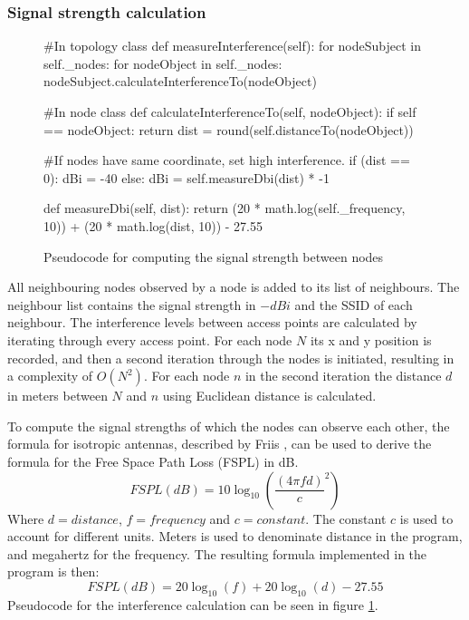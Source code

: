 	\subsubsection{Signal strength calculation}
	\begin{figure}
		\begin{python}
			#In topology class
			def measureInterference(self):
				for nodeSubject in self._nodes:  
					for nodeObject in self._nodes:
						nodeSubject.calculateInterferenceTo(nodeObject) 

			#In node class
			def calculateInterferenceTo(self, nodeObject):
				if self == nodeObject:
					return
				dist = round(self.distanceTo(nodeObject))

			#If  nodes have same coordinate, set high interference. 
				if (dist == 0):
					dBi = -40
				else:
					dBi  = self.measureDbi(dist) * -1

			def measureDbi(self, dist):
				return (20 * math.log(self._frequency, 10)) + 
				(20 * math.log(dist, 10)) - 27.55

		\end{python}
		\caption{Pseudocode for computing the signal strength between nodes}
		\label{fig:dbiCreation}
	\end{figure}

	All neighbouring nodes observed by a node is added to its list of neighbours. The neighbour list contains the signal strength in $-dBi$ and the SSID of each neighbour.
	The interference levels between access points are calculated by iterating through every access point. For each node $N$ its x and y position is recorded,
	and then a second iteration through the nodes is initiated, resulting in a complexity of $O(N^2)$. For each node $n$ in the second iteration the distance $d$ in
	meters between $N$ and $n$ using Euclidean distance is calculated.
	
	To compute the signal strengths of which the nodes can observe each other, the formula for isotropic antennas, described by Friis \cite{Friis46}, can be used to
	derive the formula for the Free Space Path Loss (FSPL) in dB. 
\[
	FSPL(dB) = 10\log_{10} \left( \frac{ (4 \pi f d)}{c} ^2 \right) 
\]	
	Where $d = distance$, $f = frequency$ and $c=constant$. The constant $c$ is used to account for different units. Meters is used to denominate distance in the program,
	and megahertz for the frequency. The resulting formula implemented in the program is then: 
\[
	FSPL(dB) = 20\log_{10}\left( f \right)  + 20\log_{10} \left(d\right) - 27.55
\]	
	Pseudocode for the interference calculation can be seen in figure \ref{fig:dbiCreation}. 

